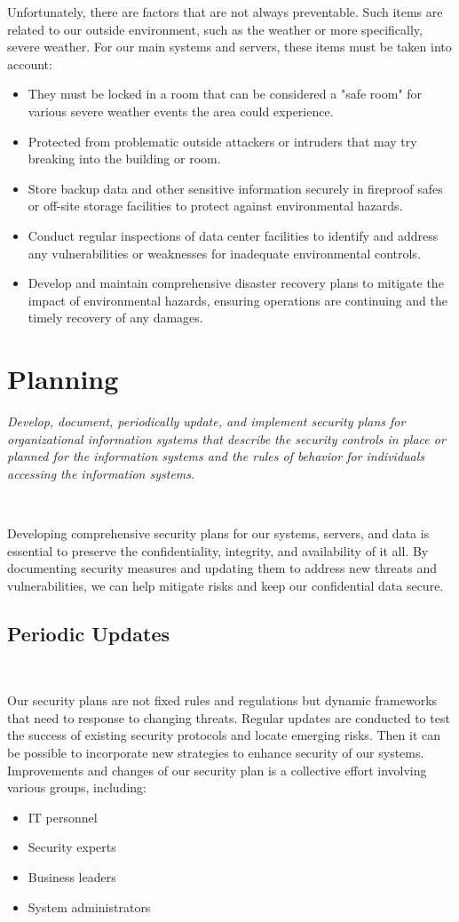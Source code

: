 \documentclass[12pt,a4paper]{report}
\begin{document}
Unfortunately, there are factors that are not always preventable.
Such items are related to our outside environment, such as the weather or more specifically, severe weather.
For our main systems and servers, these items must be taken into account:
\begin{itemize}
 \item They must be locked in a room that can be considered a "safe room" for various severe weather events the area could experience.
 \item Protected from problematic outside attackers or intruders that may try breaking into the building or room.
 \item Store backup data and other sensitive information securely in fireproof safes or off-site storage facilities to protect against environmental hazards.
 \item Conduct regular inspections of data center facilities to identify and address any vulnerabilities or weaknesses for inadequate environmental controls.
 \item Develop and maintain comprehensive disaster recovery plans to mitigate the impact of environmental hazards, ensuring operations are continuing and the timely recovery of any damages.
\end{itemize}

\chapter{Planning}
\textit{Develop, document, periodically update, and implement security plans for organizational information systems that describe the security controls in place or planned for the information systems and the rules of behavior for individuals accessing the information systems.}

\

Developing comprehensive security plans for our systems, servers, and data is essential to preserve the confidentiality, integrity, and availability of it all.
By documenting security measures and updating them to address new threats and vulnerabilities, we can help mitigate risks and keep our confidential data secure.

\section{Periodic Updates}
\

Our security plans are not fixed rules and regulations but dynamic frameworks that need to response to changing threats. 
Regular updates are conducted to test the success of existing security protocols and locate emerging risks.
Then it can be possible to incorporate new strategies to enhance security of our systems. 
Improvements and changes of our security plan is a collective effort involving various groups, including:
\begin{itemize}
 \item IT personnel
 \item Security experts
 \item Business leaders
 \item System administrators
\end{itemize}
\end{document}
